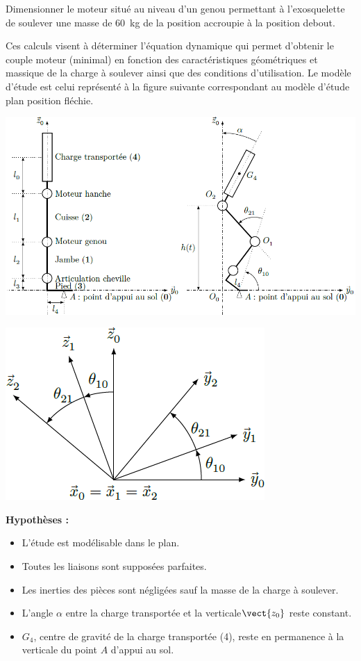 \begin{multicols}{2}
\begin{obj}
Dimensionner le moteur situé au niveau d’un genou permettant à l’exosquelette de soulever une masse de \SI{60}{kg} de la position accroupie à la position debout.
\end{obj}
\ifprof
\else
Ces calculs visent à déterminer l’équation dynamique qui permet d’obtenir le couple moteur (minimal) en fonction des caractéristiques géométriques et massique de la charge à soulever ainsi que des conditions d’utilisation.
Le modèle d’étude est celui représenté à la figure suivante correspondant au modèle d’étude plan position fléchie.
\begin{center}
\includegraphics[width=\linewidth]{images/fig_03}
\end{center}

\begin{center}
\includegraphics[width=.5\linewidth]{images/fig_14}
\end{center}


\noindent\textbf{Hypothèses :}
\begin{itemize}
\item L’étude est modélisable dans le plan.
\item Toutes les liaisons sont supposées parfaites.
\item Les inerties des pièces sont négligées sauf la masse de la charge à soulever.
\item L’angle $\alpha$ entre la charge transportée et la verticale$\vect{z_0}$ reste constant.
\item $G_4$, centre de gravité de la charge transportée (4), reste en permanence à la verticale du point $A$ d’appui au sol.
\end{itemize}


\end{multicols}
